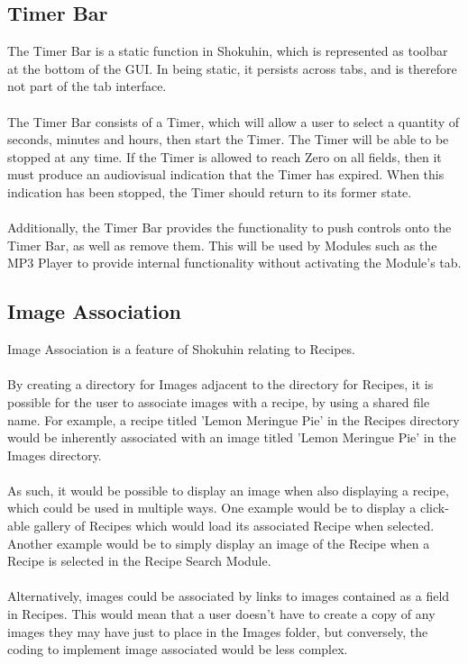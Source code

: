 \documentclass[a4paper, 12pt]{article}
\begin{document}
\subsection{Timer Bar}
The Timer Bar is a static function in Shokuhin, which is represented as toolbar at the bottom of the GUI. In being static, it persists across tabs, and is therefore not part of the tab interface.\\\\
The Timer Bar consists of a Timer, which will allow a user to select a quantity of seconds, minutes and hours, then start the Timer. The Timer will be able to be stopped at any time. If the Timer is allowed to reach Zero on all fields, then it must produce an audiovisual indication that the Timer has expired. When this indication has been stopped, the Timer should return to its former state.\\\\
Additionally, the Timer Bar provides the functionality to push controls onto the Timer Bar, as well as remove them. This will be used by Modules such as the MP3 Player to provide internal functionality without activating the Module's tab.

\subsection{Image Association}
Image Association is a feature of Shokuhin relating to Recipes.\\\\
By creating a directory for Images adjacent to the directory for Recipes, it is possible for the user to associate images with a recipe, by using a shared file name. For example, a recipe titled 'Lemon Meringue Pie' in the Recipes directory would be inherently associated with an image titled 'Lemon Meringue Pie' in the Images directory.\\\\
As such, it would be possible to display an image when also displaying a recipe, which could be used in multiple ways. One example would be to display a click-able gallery of Recipes which would load its associated Recipe when selected. Another example would be to simply display an image of the Recipe when a Recipe is selected in the Recipe Search Module.\\\\
Alternatively, images could be associated by links to images contained as a field in Recipes. This would mean that a user doesn't have to create a copy of any images they may have just to place in the Images folder, but conversely, the coding to implement image associated would be less complex.
\end{document}
